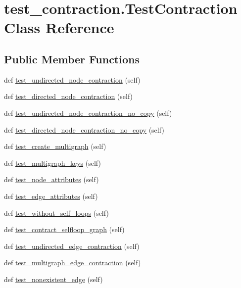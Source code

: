 \hypertarget{classtest__contraction_1_1TestContraction}{}\section{test\+\_\+contraction.\+Test\+Contraction Class Reference}
\label{classtest__contraction_1_1TestContraction}
\subsection*{Public Member Functions}
\begin{DoxyCompactItemize}
\item 
def \hyperlink{classtest__contraction_1_1TestContraction_a99060e46a50a8abf7329d3e56fd54acc}{test\+\_\+undirected\+\_\+node\+\_\+contraction} (self)
\item 
def \hyperlink{classtest__contraction_1_1TestContraction_a058f05be0771acf56c71c2793c22f52d}{test\+\_\+directed\+\_\+node\+\_\+contraction} (self)
\item 
def \hyperlink{classtest__contraction_1_1TestContraction_aeb8044cbbdd6592231a115dd8eb850f7}{test\+\_\+undirected\+\_\+node\+\_\+contraction\+\_\+no\+\_\+copy} (self)
\item 
def \hyperlink{classtest__contraction_1_1TestContraction_a9594e8e51421b7dc907472543939dfab}{test\+\_\+directed\+\_\+node\+\_\+contraction\+\_\+no\+\_\+copy} (self)
\item 
def \hyperlink{classtest__contraction_1_1TestContraction_aa5cc293219ed328b1994deafa0e76232}{test\+\_\+create\+\_\+multigraph} (self)
\item 
def \hyperlink{classtest__contraction_1_1TestContraction_af6c604b05d02ae893234831fd3ca4eb8}{test\+\_\+multigraph\+\_\+keys} (self)
\item 
def \hyperlink{classtest__contraction_1_1TestContraction_a0221d8e034c6ca8dd6d6b318cb6cbdf1}{test\+\_\+node\+\_\+attributes} (self)
\item 
def \hyperlink{classtest__contraction_1_1TestContraction_a09d7015d1266a6372d4aaa6d61d333a5}{test\+\_\+edge\+\_\+attributes} (self)
\item 
def \hyperlink{classtest__contraction_1_1TestContraction_ac14957d33ae32a7b7119893afb77760e}{test\+\_\+without\+\_\+self\+\_\+loops} (self)
\item 
def \hyperlink{classtest__contraction_1_1TestContraction_a7b1737f61c2b31c3a7f70411811df0f3}{test\+\_\+contract\+\_\+selfloop\+\_\+graph} (self)
\item 
def \hyperlink{classtest__contraction_1_1TestContraction_a43f313e891904f807668281d1b3bdfa9}{test\+\_\+undirected\+\_\+edge\+\_\+contraction} (self)
\item 
def \hyperlink{classtest__contraction_1_1TestContraction_a591461aa0a28d2a0fd9e5b0d1bf9a6c3}{test\+\_\+multigraph\+\_\+edge\+\_\+contraction} (self)
\item 
def \hyperlink{classtest__contraction_1_1TestContraction_acaae9e77c4ae8ea3f80ace57afb60cce}{test\+\_\+nonexistent\+\_\+edge} (self)
\end{DoxyCompactItemize}


